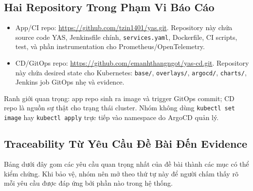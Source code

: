 \subsection{Hai Repository Trong Phạm Vi Báo Cáo}

\begin{itemize}
    \item App/CI repo: \url{https://github.com/tzin1401/yas.git}. Repository này chứa source code YAS, Jenkinsfile chính, \texttt{services.yaml}, Dockerfile, CI scripts, test, và phần instrumentation cho Prometheus/OpenTelemetry.
    \item CD/GitOps repo: \url{https://github.com/emanhthangngot/yas-cd.git}. Repository này chứa desired state cho Kubernetes: \texttt{base/}, \texttt{overlays/}, \texttt{argocd/}, \texttt{charts/}, Jenkins job GitOps nhẹ và evidence.
\end{itemize}

Ranh giới quan trọng: app repo sinh ra image và trigger GitOps commit; CD repo là nguồn sự thật cho trạng thái cluster. Nhóm không dùng \texttt{kubectl set image} hay \texttt{kubectl apply} trực tiếp vào namespace do ArgoCD quản lý.

\subsection{Traceability Từ Yêu Cầu Đề Bài Đến Evidence}

Bảng dưới đây gom các yêu cầu quan trọng nhất của đề bài thành các mục có thể kiểm
chứng. Khi bảo vệ, nhóm nên mở theo thứ tự này để người chấm thấy rõ mỗi yêu cầu
được đáp ứng bởi phần nào trong hệ thống.

